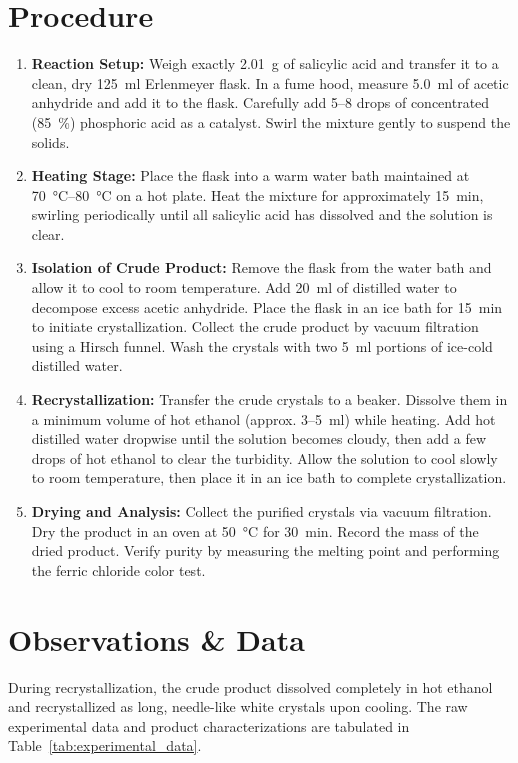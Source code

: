 \documentclass[11pt,a4paper]{article}
\begin{document}
\section{Procedure}
\begin{enumerate}[label=\textbf{\arabic*.}, leftmargin=*, itemsep=3pt]
    \item \textbf{Reaction Setup:} Weigh exactly \qty{2.01}{\gram} of salicylic acid and transfer it to a clean, dry \qty{125}{\milli\litre} Erlenmeyer flask. In a fume hood, measure \qty{5.0}{\milli\litre} of acetic anhydride and add it to the flask. Carefully add \num{5}--\num{8} drops of concentrated (\qty{85}{\percent}) phosphoric acid as a catalyst. Swirl the mixture gently to suspend the solids.
    \item \textbf{Heating Stage:} Place the flask into a warm water bath maintained at \qtyrange{70}{80}{\degreeCelsius} on a hot plate. Heat the mixture for approximately \qty{15}{\minute}, swirling periodically until all salicylic acid has dissolved and the solution is clear.
    \item \textbf{Isolation of Crude Product:} Remove the flask from the water bath and allow it to cool to room temperature. Add \qty{20}{\milli\litre} of distilled water to decompose excess acetic anhydride. Place the flask in an ice bath for \qty{15}{\minute} to initiate crystallization. Collect the crude product by vacuum filtration using a Hirsch funnel. Wash the crystals with two \qty{5}{\milli\litre} portions of ice-cold distilled water.
    \item \textbf{Recrystallization:} Transfer the crude crystals to a beaker. Dissolve them in a minimum volume of hot ethanol (approx. \num{3}--\qty{5}{\milli\litre}) while heating. Add hot distilled water dropwise until the solution becomes cloudy, then add a few drops of hot ethanol to clear the turbidity. Allow the solution to cool slowly to room temperature, then place it in an ice bath to complete crystallization.
    \item \textbf{Drying and Analysis:} Collect the purified crystals via vacuum filtration. Dry the product in an oven at \qty{50}{\degreeCelsius} for \qty{30}{\minute}. Record the mass of the dried product. Verify purity by measuring the melting point and performing the ferric chloride color test.
\end{enumerate}

\section{Observations \& Data}
During recrystallization, the crude product dissolved completely in hot ethanol and recrystallized as long, needle-like white crystals upon cooling. The raw experimental data and product characterizations are tabulated in Table~\ref{tab:experimental_data}.
\end{document}

